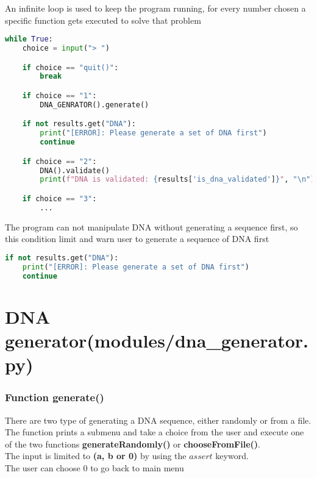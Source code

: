 \documentclass[11pt]{article}
\begin{document}
An infinite loop is used to keep the program running,
for every number chosen a specific function gets executed to solve that problem
\begin{lstlisting}[language=Python, style=PythonStyle]
while True:
    choice = input("> ")

    if choice == "quit()":
        break

    if choice == "1":
        DNA_GENRATOR().generate()

    if not results.get("DNA"):
        print("[ERROR]: Please generate a set of DNA first")
        continue

    if choice == "2":
        DNA().validate()
        print(f"DNA is validated: {results['is_dna_validated']}", "\n")

    if choice == "3":
        ...
\end{lstlisting}
The program can not manipulate DNA without generating a sequence first, so this condition limit and warn user to generate a sequence of DNA first
\begin{lstlisting}[language=Python, style=PythonStyle]
if not results.get("DNA"):
    print("[ERROR]: Please generate a set of DNA first")
    continue
\end{lstlisting}

\section{DNA generator(modules/dna\_generator.py)}
\subsubsection{Function generate()}
There are two type of generating a DNA sequence, either randomly or from a file.\\
The function prints a submenu and take a choice from the user and execute one of the two functions \textbf{generateRandomly()} or \textbf{chooseFromFile()}.\\
The input is limited to \textbf{(a, b or 0)} by using the \(assert\) keyword.\\
The user can choose \(0\) to go back to main menu
\end{document}
